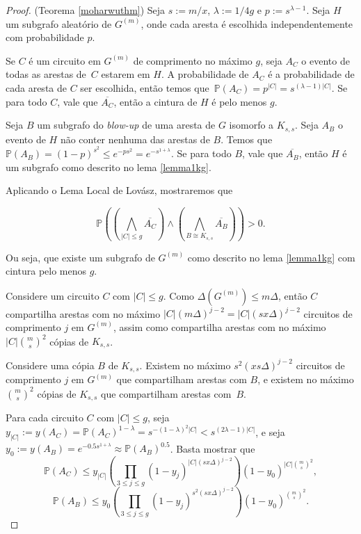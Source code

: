 \documentclass{article}
\newcommand{\bbp}{\mathbb{P}}
\begin{document}
\begin{proof}{(Teorema \ref{moharwuthm})}
Seja $s := m/x$, $\lambda := 1/4g$ e $p := s^{\lambda-1}$. Seja $H$ um subgrafo aleatório de $G^{(m)}$, onde cada aresta é escolhida independentemente com probabilidade $p$.

Se $C$ é um circuito em $G^{(m)}$ de comprimento no máximo $g$, seja $A_C$ o evento de todas as arestas de~$C$ estarem em $H$. A probabilidade de $A_C$ é a probabilidade de cada aresta de $C$ ser escolhida, então temos que~$\bbp(A_C) = p^{|C|} = s^{(\lambda-1)|C|}$. Se para todo $C$, vale que $\overline{A_C}$, então a cintura de $H$ é pelo menos $g$.

Seja $B$ um subgrafo do \textit{blow-up} de uma aresta de $G$ isomorfo a $K_{s,s}$. Seja $A_B$ o evento de $H$ não conter nenhuma das arestas de $B$. Temos que $\bbp(A_B) = (1-p)^{s^2} \leq e^{-ps^2} = e^{-s^{1+\lambda}}$. Se para todo $B$, vale que $\overline{A_B}$, então $H$ é um subgrafo como descrito no lema \ref{lemma1kg}.

Aplicando o Lema Local de Lovász, mostraremos que

\[\bbp\left(\left(\bigwedge\limits_{|C|\leq g}\overline{A_C}\right)\wedge\left(\bigwedge\limits_{B\cong K_{s,s}}\overline{A_B}\right)\right) > 0.\]

Ou seja, que existe um subgrafo de $G^{(m)}$ como descrito no lema \ref{lemma1kg} com cintura pelo menos $g$.

Considere um circuito $C$ com $|C| \leq g$. Como $\Delta(G^{(m)}) \leq m\Delta$, então $C$ compartilha arestas com no máximo $|C|(m\Delta)^{j-2} = |C|(sx\Delta)^{j-2}$ circuitos de comprimento $j$ em $G^{(m)}$, assim como compartilha arestas com no máximo $|C|\binom{m}{s}^2$ cópias de $K_{s,s}$.

Considere uma cópia $B$ de $K_{s,s}$. Existem no máximo $s^2(xs\Delta)^{j-2}$ circuitos de comprimento $j$ em $G^{(m)}$ que compartilham arestas com $B$, e existem no máximo $\binom{m}{s}^2$ cópias de $K_{s,s}$ que compartilham arestas com~$B$.

Para cada circuito $C$ com $|C| \leq g$, seja $y_{|C|} := y(A_C) = \bbp(A_C)^{1-\lambda} = s^{-(1-\lambda)^2|C|} < s^{(2\lambda - 1)|C|}$, e seja~$y_0 := y(A_B) = e^{-0.5s^{1+\lambda}} \approx \bbp(A_B)^{0.5}$. Basta mostrar que
\begin{equation}\label{eq1}
\bbp(A_C) \leq y_{|C|}\left(\prod_{3\leq j\leq g}(1-y_j)^{|C|(sx\Delta)^{j-2}}\right)(1-y_0)^{|C|\binom{m}{s}^2},
\end{equation}
\begin{equation}\label{eq2}
\bbp(A_B)\leq y_0 \left(\prod_{3\leq j\leq g}(1-y_j)^{s^2(sx\Delta)^{j-2}}\right)(1-y_0)^{\binom{m}{s}^2}.
\end{equation}


\end{proof}
\end{document}
